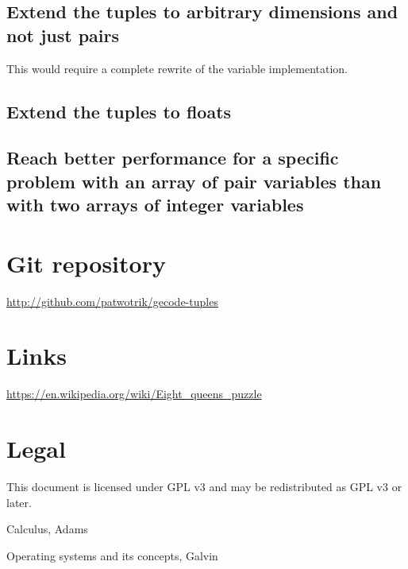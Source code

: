 \documentclass[a4paper,11pt]{article}
\begin{document}
\subsection{Extend the tuples to arbitrary dimensions and not just pairs}
This would require a complete rewrite of the variable implementation.
\subsection{Extend the tuples to floats}
\subsection{Reach better performance for a specific problem with an array of pair variables than with two arrays of integer variables}

\section{Git repository}
\url{http://github.com/patwotrik/gecode-tuples}

\section{Links}
\url{https://en.wikipedia.org/wiki/Eight_queens_puzzle}

\section{Legal}
This document is licensed under GPL v3 and may be redistributed as GPL v3 or later. 



\begin{thebibliography}{99}
	Calculus, 
	Adams
	
	Operating systems and its concepts,
	Galvin
\end{thebibliography}
\end{document}
